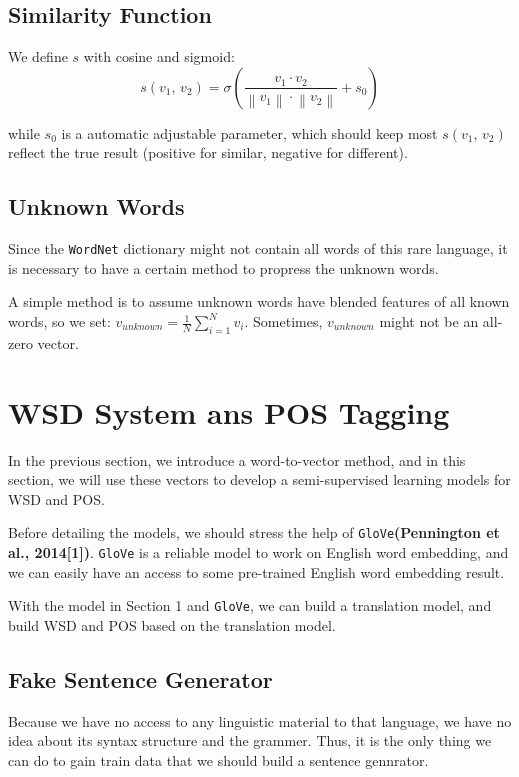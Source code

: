 \documentclass[11pt,a4paper]{article}
\begin{document}
\subsection{Similarity Function}

We define $s$ with cosine and sigmoid:
$$s(v_{1},\,v_{2})=\sigma\left(\frac{v_{1}\cdot v_{2}}{\left\|v_{1}\right\|\cdot\left\|v_{2}\right\|}+s_{0}\right)$$

while $s_{0}$ is a automatic adjustable parameter, which should keep most $s(v_{1},\,v_{2})$ reflect the true result (positive for similar, negative for different).

\subsection{Unknown Words}

Since the \texttt{WordNet} dictionary might not contain all words of this rare language, 
it is necessary to have a certain method to propress the unknown words.

A simple method is to assume unknown words have blended features of all known words,
so we set: $v_{unknown}=\frac{1}{N}\sum_{i=1}^{N}v_{i}$. Sometimes, $v_{unknown}$ might not
be an all-zero vector.

\section{WSD System ans POS Tagging}

In the previous section, we introduce a word-to-vector method, and in this section, 
we will use these vectors to develop a semi-supervised learning models for WSD and POS.

Before detailing the models, we should stress the help of \texttt{GloVe}\textbf{(Pennington et al., 2014[1])}. %
\texttt{GloVe} is a reliable model to work on English word embedding, and we can easily 
have an access to some pre-trained English word embedding result. 

With the model in Section 1 and \texttt{GloVe}, we can build a translation model, and build
WSD and POS based on the translation model.

\subsection{Fake Sentence Generator}

Because we have no access to any linguistic material to that language, we have no idea about 
its syntax structure and the grammer. Thus, it is the only thing we can do to gain train data 
that we should build a sentence gennrator.
\end{document}
